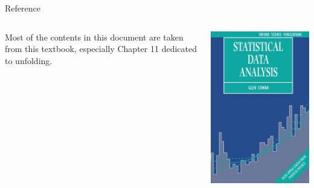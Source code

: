 \documentclass[aspectratio=169]{beamer}
\begin{document}
\begin{frame}{Reference}
  \begin{columns}
    \begin{column}{.5\textwidth}
      Most of the contents in this document are taken from this textbook, especially Chapter 11 dedicated to unfolding.
    \end{column}
    \begin{column}{.5\textwidth}
      \centering
      \includegraphics[height=\textheight]{figures/cowan_front_cover.jpeg}
    \end{column}
  \end{columns}
\end{frame}
\end{document}
